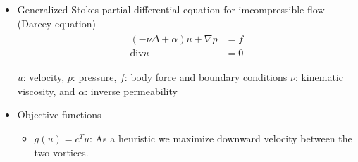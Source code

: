 \documentclass[dvips,landscape]{foils}
\begin{document}
\begin{itemize}\setlength{\parskip}{0pt}  \setlength{\itemsep}{5pt} \setlength{\topsep}{0pt}
\item Generalized Stokes partial differential equation for imcompressible flow (Darcey equation)
       \begin{eqnarray*}
         \begin{aligned}
       ( -\nu\Delta + \alpha ) u +\nabla  p & = f\\
       \text{div} u& =  0
         \end{aligned}
       \end{eqnarray*}
       
       $u$: velocity, $p$: pressure, $f$: body force and boundary conditions
       $\nu$: kinematic viscosity, and $\alpha$: inverse permeability

\item Objective functions
  \begin{itemize}
      \item $g(u)=c^T u$: As a heuristic we maximize downward velocity between the two vortices.
  \end{itemize}





\end{itemize}
\end{document}
